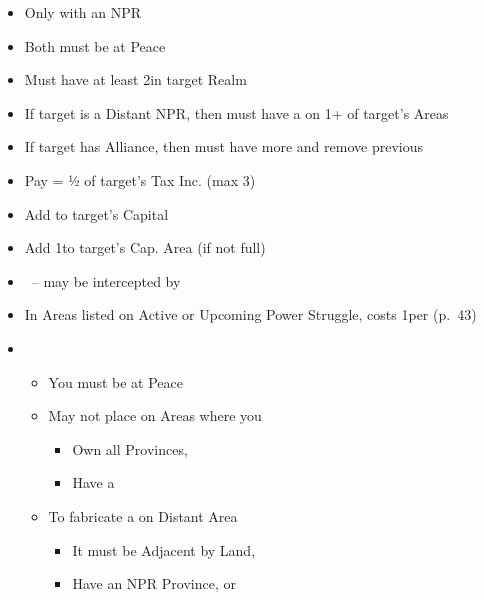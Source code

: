\documentclass[10pt]{article}
\begin{document}
\begin{itemize}
	\item Only with an NPR
	\item Both must be at Peace
	\item Must have at least 2\influence in target Realm
	\item If target is a Distant NPR, then must have a \claim on 1+ of target's Areas
	\item If target has Alliance, then must have more \influence and remove previous \alliance
	\item Pay \diplopower = ½ of target's Tax Inc. (max 3)
	\item Add \alliance to target's Capital
	\item Add 1\influence to target's Cap. Area (if not full)
\end{itemize}

\begin{itemize}
	\item \covertaction~-- may be intercepted by 
	\item In Areas listed on Active or Upcoming Power Struggle, costs 1\diplopower per \claim (p.~43)
	\item {}
	\begin{itemize}
		\item You must be at Peace
		\item May not place \claim on Areas where you
		\begin{itemize}
			\item Own all Provinces,  
			\item Have a \claim
		\end{itemize}
		\item To fabricate a \claim on Distant Area
		\begin{itemize}
			\item It must be Adjacent by Land, 
			\item Have an NPR Province, \vassal or \town
		\end{itemize}
	\end{itemize}
\end{itemize}
\end{document}
